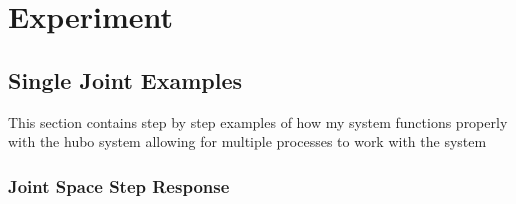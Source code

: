 \chapter{Experiment}






\section{Single Joint Examples}\label{sec:simpleExamples}
This section contains step by step examples of how my system functions properly with the hubo system allowing for multiple processes to work with the system

	\subsection{Joint Space Step Response}\label{sec:singlejointStep}
		
